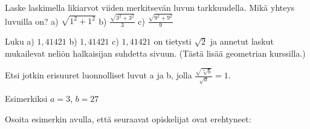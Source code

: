 \begin{tehtavasivu}
\begin{tehtava} Laske laskimella likiarvot viiden merkitsevän luvun tarkkuudella. Mikä yhteys luvuilla on?
a) $ \sqrt{1^2+1^2}$ \quad b)  $ \frac {\sqrt{3^2+3^2}}{3}$    \quad c)  $ \frac {\sqrt{9^2+9^2}}{9}$  \quad 
\begin{vastaus}
Luku a) $1,41421$ \quad b) $1,41421$ \quad c) $1,41421$ on tietysti $\sqrt{2}$ ja annetut laskut mukailevat neliön halkaisijan suhdetta sivuun. (Tästä lisää geometrian kurssilla.) %
\end{vastaus}
\end{tehtava}



\begin{tehtava} Etsi jotkin erisuuret luonnolliset luvut a ja b, jolla $\frac{\sqrt{\sqrt[a]{b}}}{\sqrt{a}}=1$.
\begin{vastaus}
Esimerkiksi $a=3$, \quad $b=27$ 
\end{vastaus}
\end{tehtava}

\begin{tehtava}
	Osoita esimerkin avulla, että seuraavat opiskelijat ovat erehtyneet:
	\begin{vastaus}
	\end{vastaus}
\end{tehtava}

\end{tehtavasivu}
